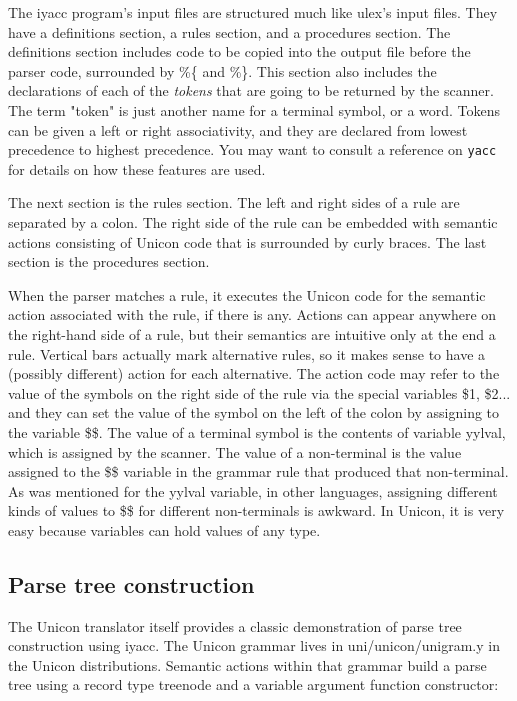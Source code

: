 The \textsf{iyacc} program's input files are structured
much like \textsf{ulex}'s input files. They have a
definitions section, a rules section, and a procedures section. The
definitions section includes code to be copied into the output file
before the parser code, surrounded by \textsf{\%\{} and \textsf{\%\}}.
This section also includes the declarations of each of the
\textit{tokens} that are going to be returned by the scanner. The term
"token" is just another name for a terminal
symbol, or a word. Tokens can be given a left or right associativity,
and they are declared from lowest precedence to highest precedence. You
may want to consult a reference on \texttt{yacc} for details on how
these features are used.

The next section is the rules section. The left and right sides of a
rule are separated by a colon. The right side of the rule can be
embedded with semantic actions consisting of Unicon code that is
surrounded by curly braces. The last section is the procedures section.

When the parser matches a rule, it executes the Unicon code for the
semantic action associated with the rule, if there is any. Actions can
appear anywhere on the right-hand side of a rule, but their semantics
are intuitive only at the end a rule. Vertical bars actually mark
alternative rules, so it makes sense to have a (possibly different)
action for each alternative. The action code may refer to the value of
the symbols on the right side of the rule via the special variables
\textsf{\$1}, \textsf{\$2}... and they can set the value of the symbol
on the left of the colon by assigning to the variable \textsf{\$\$}.
The value of a terminal symbol is the contents of variable
\textsf{yylval}, which is assigned by the scanner. The value of a
non-terminal is the value assigned to the \textsf{\$\$} variable in the
grammar rule that produced that non-terminal. As was mentioned for the
\textsf{yylval} variable, in other languages, assigning different kinds
of values to \textsf{\$\$} for different non-terminals is awkward. In
Unicon, it is very easy because variables can hold values of any type.

\subsection{Parse tree construction}

The Unicon translator itself provides a classic demonstration of parse
tree construction using \textsf{iyacc}. The Unicon grammar lives in
\textsf{uni/unicon/unigram.y} in the Unicon distributions. Semantic
actions within that grammar build a parse tree using a record type
\textsf{treenode} and a variable argument function constructor:

